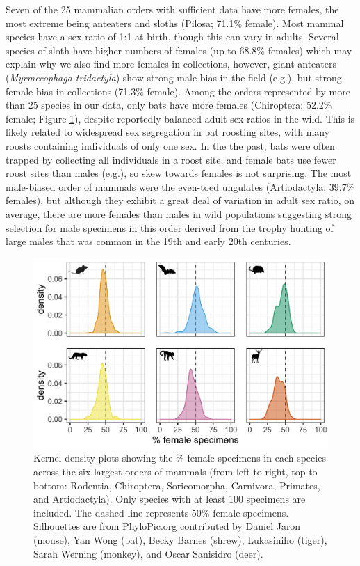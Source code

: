 \documentclass[a4paper, 12pt]{article}
\begin{document}
Seven of the 25 mammalian orders with sufficient data have more females, the most extreme being anteaters and sloths (Pilosa; 71.1\% female). 
Most mammal species have a sex ratio of 1:1 at birth\cite{karlin1986theoretical}, though this can vary in adults. 
Several species of sloth have higher numbers of females (up to 68.8\% females\cite{reyes2015informacion}) which may explain why we also find more females in collections, however, giant anteaters (\textit{Myrmecophaga tridactyla}) show strong male bias in the field (e.g.\cite{defreitas2015}), but strong female bias in collections (71.3\% female). 
Among the orders represented by more than 25 species in our data, only bats have more females (Chiroptera; 52.2\% female; Figure \ref{fig-mammal_order_six}), despite reportedly balanced adult sex ratios in the wild\cite{altringham}. 
This is likely related to widespread sex segregation in bat roosting sites, with many roosts containing individuals of only one sex\cite{altringham}. 
In the the past, bats were often trapped by collecting all individuals in a roost site, and female bats use fewer roost sites than males (e.g.\cite{encarnaccao2012spatiotemporal}), so skew towards females is not surprising. 
The most male-biased order of mammals were the even-toed ungulates (Artiodactyla; 39.7\% females), but although they exhibit a great deal of variation in adult sex ratio, on average, there are more females than males in wild populations\cite{berger1999sex} suggesting strong selection for male specimens in this order derived from the trophy hunting of large males that was common in the 19th and early 20th centuries.

\begin{figure}
 \centering
  \includegraphics[width = \linewidth]{figures/orders-density-mammals-six.png}
  \caption{Kernel density plots showing the \% female specimens in each species across the six largest orders of mammals (from left to right, top to bottom: Rodentia, Chiroptera, Soricomorpha, Carnivora, Primates, and Artiodactyla). 
  Only species with at least 100 specimens are included. 
  The dashed line represents 50\% female specimens. 
  Silhouettes are from PhyloPic.org contributed by Daniel Jaron (mouse), Yan Wong (bat), Becky Barnes (shrew), Lukasiniho (tiger), Sarah Werning (monkey), and Oscar Sanisidro (deer).
}
  \label{fig-mammal_order_six}
\end{figure}
\end{document}
